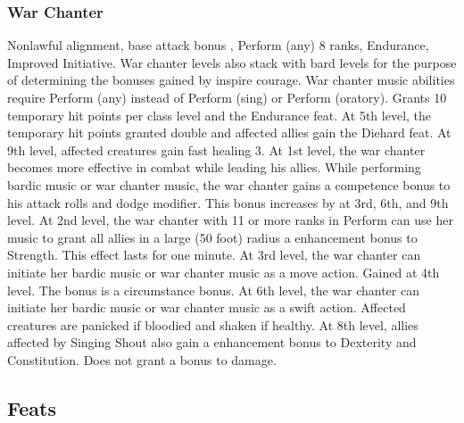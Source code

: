 \subsubsection{War Chanter}
 Nonlawful alignment, base attack bonus , Perform (any) 8 ranks, Endurance, Improved Initiative.
 War chanter levels also stack with bard levels for the purpose of determining the bonuses gained by inspire courage. War chanter music abilities require Perform (any) instead of Perform (sing) or Perform (oratory).
 Grants 10 temporary hit points  per class level and the Endurance feat. At 5th level, the temporary hit points granted double and affected allies gain the Diehard feat. At 9th level, affected creatures gain fast healing 3.
 At 1st level, the war chanter becomes more effective in combat while leading his allies. While performing bardic music or war chanter music, the war chanter gains a  competence bonus to his attack rolls and dodge modifier. This bonus increases by  at 3rd, 6th, and 9th level.
 At 2nd level, the war chanter with 11 or more ranks in Perform can use her music to grant all allies in a large (50 foot) radius a  enhancement bonus to Strength. This effect lasts for one minute.
 At 3rd level, the war chanter can initiate her bardic music or war chanter music as a move action.
 Gained at 4th level. The bonus is a circumstance bonus.
 At 6th level, the war chanter can initiate her bardic music or war chanter music as a swift action.
 Affected creatures are panicked if bloodied and shaken if healthy.
 At 8th level, allies affected by Singing Shout also gain a  enhancement bonus to Dexterity and Constitution.
 Does not grant a bonus to damage.

\subsection{Feats}
